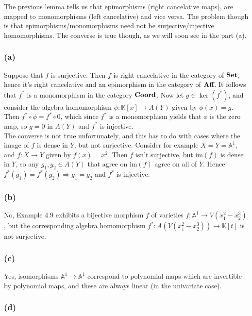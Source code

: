 \documentclass{article}
\theoremstyle{definition}
\newcommand{\K}{\mathbb{K}}
\newcommand{\A}{\mathbb{A}}
\newcommand{\im}{\text{im}}
\newcommand{\catname}[1]{{\normalfont\textbf{#1}}}
\newcommand{\Set}{\catname{Set}}
\begin{document}
The previous lemma tells us that epimorphisms (right cancelative maps), are
mapped to monomorphisms (left cancelative) and vice versa. The problem though
is that epimorphisms/monomorphisms need not be surjective/injective
homomorphisms. The converse is true though, as we will soon see in the part
(a).

\subsubsection*{(a)}

Suppose that $f$ is surjective. Then $f$ is right cancelative in the category
of $\Set$, hence it's right cancelative and an epimorphism in the category of
$\catname{Aff}$. It follows that $f^{*}$ is a monomorphism in the category
$\catname{Coord}$. Now let $g \in \ker(f^{*})$, and consider the algebra
homomorphism $\phi : \K[x] \to A(Y)$ given by $\phi(x) = g$. Then $f^{*} \circ
\phi = f^{*} \circ 0$, which since $f^{*}$ is a monomorphism yields that $\phi$
is the zero map, so $g = 0$ in $A(Y)$ and $f^{*}$ is injective. \\

The converse is not true unfortunately, and this has to do with cases where the
image of $f$ is dense in $Y$, but not surjective. Consider for example $X = Y =
\A^{1}$, and $f : X \to Y$ given by $f(x) = x^{2}$. Then $f$ isn't surjective,
but $\im(f)$ is dense in $Y$, so any $g_1, g_2 \in A(Y)$ that agree on $\im(f)$
agree on all of $Y$. Hence $f^{*}(g_1) = f^{*}(g_2) \Rightarrow g_1 = g_2$ and
$f^{*}$ is injective.

\subsubsection*{(b)}

No, Example 4.9 exhibits a bijective morphism $f$ of varieties $f: \A^{1} \to
V(x_1^{2} - x_2^{3})$, but the corresponding algebra homomorphism $f^{*} :
A(V(x_1^{2} - x_2^{3})) \to \K[t]$ is not surjective.

\subsubsection*{(c)}

Yes, isomorphisms $\A^{1} \to \A^{1}$ correspond to polynomial maps which are
invertible by polynomial maps, and these are always linear (in the univariate
case).

\subsubsection*{(d)}
\end{document}

